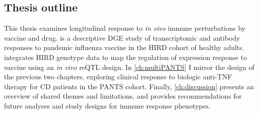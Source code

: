 \begin{outline}
%

\section{Thesis outline}

This thesis examines longitudinal response to \textit{in vivo} immune perturbations by vaccine and drug.
 is a descriptive \gls{DGE} study of transcriptomic and antibody responses to pandemic influenza vaccine in the \gls{HIRD} cohort of healthy adults.
 integrates \gls{HIRD} genotype data to map the regulation of expression response to vaccine using an \textit{in vivo} \gls{reQTL} design.
In \cref{ch:multiPANTS} I mirror the design of the previous two chapters, 
exploring clinical response to biologic anti-\gls{TNF} therapy for \gls{CD} patients in the \gls{PANTS} cohort.
Finally, \cref{ch:discussion} presents an overview of shared themes and limitations,
and provides recommendations for future analyses and study designs for immune response phenotypes.


\end{outline}
